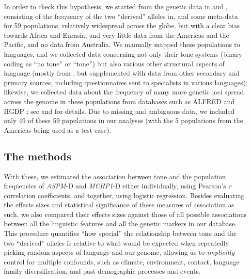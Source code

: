 \documentclass[twoside,twocolumn]{article}
\begin{document}
In order to check this hypothesis, we started from the genetic data in \citet{evans_microcephalin_2005} and \citet{mekelbobrov_aspm_2005}, consisting of the frequency of the two ``derived'' alleles in, and some meta-data for 59 populations, relatively widespread across the globe, but with a clear bias towards Africa and Eurasia, and very little data from the Americas and the Pacific, and no data from Australia.
We manually mapped these populations to languages, and we collected data concerning not only their tone systems (binary coding as ``no tone'' or ``tone'') but also various other structural aspects of language (mostly from \citealp{haspelmath_wals_2005}, but supplemented with data from other secondary and primary sources, including questionnaires sent to specialists in various languages); likewise, we collected data about the frequency of many more genetic loci spread across the genome in these populations from databases such as ALFRED \citep{rajeevan_alfred_2003} and HGDP \citep{cavallisforza_hdgp_2005}; see \citet{dediu_ladd_2007} and \citet{dediu_phd_2007} for details.
Due to missing and ambiguous data, we included only 49 of these 59 populations in our analyses (with the 5 populations from the Americas being used as a test case).

\subsection{The methods}

With these, we estimated the association between tone and the population frequencies of \textit{ASPM}-D and \textit{MCHP1}-D either individually, using Pearson’s \textit{r} correlation coefficients, and together, using logistic regression.
Besides evaluating the effects sizes and statistical significance of these measures of association as such, we also compared their effects sizes against those of all possible associations between all the linguistic features and all the genetic markers in our database.
This procedure quantifies ``how special'' the relationship between tone and the two ``derived'' alleles is relative to what would be expected when repeatedly picking random aspects of language and our genome, allowing us to \emph{implicitly} control for multiple confounds, such as climate, environment, contact, language family diversification, and past demographic processes and events.
\end{document}
